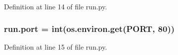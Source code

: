 Definition at line 14 of file run.\+py.

\subsubsection[{\texorpdfstring{port}{port}}]{\setlength{\rightskip}{0pt plus 5cm}run.\+port = int(os.\+environ.\+get(\textquotesingle{}P\+O\+RT\textquotesingle{}, 80))}\hypertarget{namespacerun_a7a6a5c33b9e900b36c2b941d5212210e}{}\label{namespacerun_a7a6a5c33b9e900b36c2b941d5212210e}


Definition at line 15 of file run.\+py.

